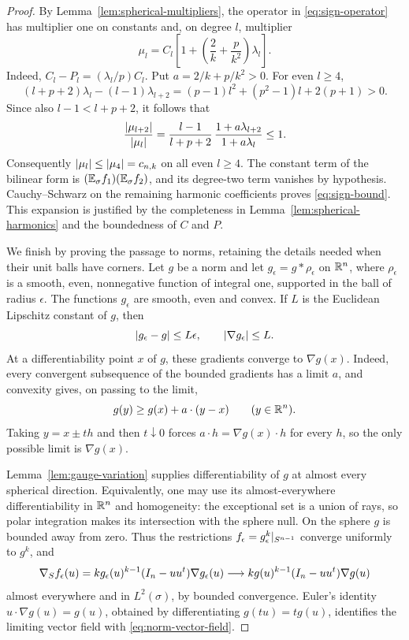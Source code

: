 \begin{proof}
By Lemma~\ref{lem:spherical-multipliers}, the operator in
\eqref{eq:sign-operator} has multiplier one on constants and, on degree
$l$, multiplier
\[
 \mu_l=C_l\left[1+\left(\frac2k+\frac p{k^2}\right)\lambda_l\right].
\]
Indeed, $C_l-P_l=(\lambda_l/p)C_l$.
Put $a=2/k+p/k^2>0$.  For even $l\ge4$,
\[
 (l+p+2)\lambda_l-(l-1)\lambda_{l+2}
 =(p-1)l^2+(p^2-1)l+2(p+1)>0.
\]
Since also $l-1<l+p+2$, it follows that
\[
 \frac{\left|\mu_{l+2}\right|}{\left|\mu_l\right|}
 =\frac{l-1}{l+p+2}\,
   \frac{1+a\lambda_{l+2}}{1+a\lambda_l}\le1.
\]
Consequently $\left|\mu_l\right|\le\left|\mu_4\right|=c_{n,k}$ on all even
$l\ge4$.  The constant term of the bilinear form is
$(\mathbb E_{\sigma} f_1)(\mathbb E_{\sigma} f_2)$, and its degree-two term vanishes by hypothesis.
Cauchy--Schwarz on the remaining harmonic coefficients proves
\eqref{eq:sign-bound}.  This expansion is justified by the completeness
in Lemma~\ref{lem:spherical-harmonics} and the boundedness of $C$ and
$P$.

We finish by proving the passage to norms, retaining the details
needed when their unit balls have corners.  Let $g$ be a norm and let
$g_\epsilon=g*\rho_\epsilon$ on $\mathbb R^n$, where $\rho_\epsilon$ is a
smooth, even, nonnegative function of integral one, supported in the
ball of radius $\epsilon$.  The functions $g_\epsilon$ are smooth,
even and convex.  If $L$ is the Euclidean Lipschitz constant of $g$,
then
\[
 \left|g_\epsilon-g\right|\le L\epsilon,
 \qquad \left|\nabla g_\epsilon\right|\le L.
\]
At a differentiability point $x$ of $g$, these gradients converge to
$\nabla g(x)$.  Indeed, every convergent subsequence of the bounded
gradients has a limit $a$, and convexity gives, on passing to the
limit,
\[
 g(y)\ge g(x)+a\cdot(y-x)\qquad(y\in\mathbb R^n).
\]
Taking $y=x\pm th$ and then $t\downarrow0$ forces
$a\cdot h=\nabla g(x)\cdot h$ for every $h$, so the only possible
limit is $\nabla g(x)$.

Lemma~\ref{lem:gauge-variation} supplies differentiability of $g$ at
almost every spherical direction.  Equivalently, one may use its
almost-everywhere differentiability in $\mathbb R^n$ and homogeneity: the
exceptional set is a union of rays, so polar integration makes its
intersection with the sphere null.  On the sphere $g$ is bounded away
from zero.  Thus the restrictions
$f_\epsilon=g_\epsilon^k|_{S^{n-1}}$ converge uniformly to $g^k$, and
\[
 \nabla_S f_\epsilon(u)
 =k g_\epsilon(u)^{k-1}
   (I_n-uu^t)\nabla g_\epsilon(u)
 \longrightarrow
 k g(u)^{k-1}(I_n-uu^t)\nabla g(u)
\]
almost everywhere and in $L^2(\sigma)$, by bounded convergence.
Euler's identity $u\cdot\nabla g(u)=g(u)$, obtained by differentiating
$g(tu)=tg(u)$, identifies the limiting vector field with
\eqref{eq:norm-vector-field}.


\end{proof}
